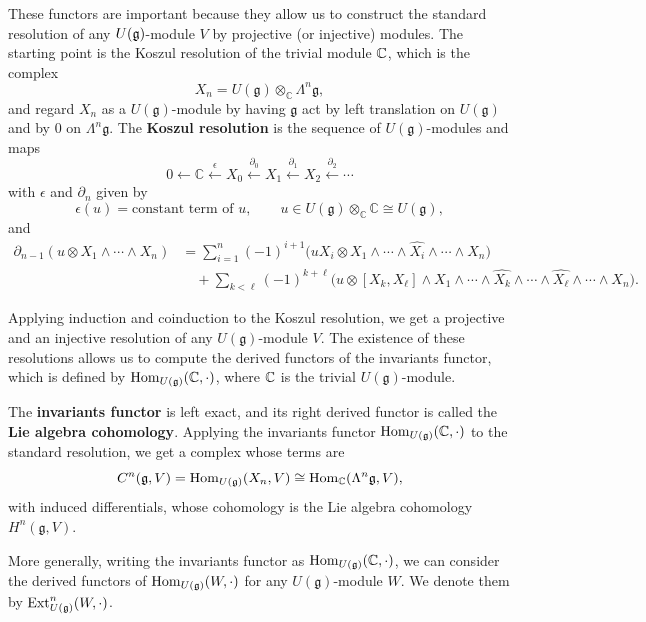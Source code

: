 \documentclass[12pt]{article}
\begin{document}
These functors are important because they allow us to construct the standard resolution of any $U(\mathfrak{g})$-module $V$ by projective (or injective) modules. The starting point is the Koszul resolution of the trivial module $\mathbb{C}$, which is the complex
\[
X_n = U(\mathfrak g)\otimes_{\mathbb C}\Lambda^n \mathfrak g,
\]
and regard $X_n$ as a $U(\mathfrak g)$-module by having $\mathfrak g$
act by left translation on $U(\mathfrak g)$ and by $0$ on
$\Lambda^n \mathfrak g$. The \textbf{Koszul resolution} is the sequence
of $U(\mathfrak g)$-modules and maps
\[
0 \longleftarrow \mathbb C
\stackrel{\epsilon}{\longleftarrow} X_0
\stackrel{\partial_0}{\longleftarrow} X_1
\stackrel{\partial_1}{\longleftarrow} X_2
\stackrel{\partial_2}{\longleftarrow} \cdots
\]
with $\epsilon$ and $\partial_n$ given by
\[
\epsilon(u)=\text{constant term of }u,
\qquad
u\in U(\mathfrak g)\otimes_{\mathbb C}\mathbb C \cong U(\mathfrak g),
\]
and
\begin{align*}
\partial_{n-1}(u\otimes X_1\wedge\cdots\wedge X_n)
&=
\sum_{i=1}^n (-1)^{i+1}
\bigl(uX_i\otimes X_1\wedge\cdots\wedge \widehat{X_i}\wedge\cdots\wedge X_n\bigr)
\nonumber\\
&\quad
+\sum_{k<\ell} (-1)^{k+\ell}
\bigl(u\otimes [X_k,X_\ell]\wedge X_1\wedge\cdots\wedge \widehat{X_k}
\wedge\cdots\wedge \widehat{X_\ell}\wedge\cdots\wedge X_n\bigr).
\end{align*}

Applying induction and coinduction to the Koszul resolution, we get a projective and an injective resolution of any $U(\mathfrak g)$-module $V$. The existence of these resolutions allows us to compute the derived functors of the invariants functor, which is defined by $\operatorname{Hom}_{U(\mathfrak g)}(\mathbb{C},\cdot)$, where $\mathbb{C}$ is the trivial $U(\mathfrak g)$-module.


The \textbf{invariants functor} is left exact, and its right derived functor is called the \textbf{Lie algebra cohomology}. Applying the invariants functor $\operatorname{Hom}_{U(\mathfrak g)}(\mathbb{C},\cdot)$ to the standard resolution, we get a complex whose terms are \[C^n(\mathfrak g,V)=\operatorname{Hom}_{U(\mathfrak g)}(X_n,V)\cong \operatorname{Hom}_{\mathbb C}(\Lambda^n \mathfrak g,V),\] with induced differentials, whose cohomology is the Lie algebra cohomology $H^n(\mathfrak g,V)$.

More generally, writing the invariants functor as $\operatorname{Hom}_{U(\mathfrak g)}(\mathbb{C},\cdot)$, we can consider the derived functors of $\operatorname{Hom}_{U(\mathfrak g)}(W,\cdot)$ for any $U(\mathfrak g)$-module $W$. We denote them by $\operatorname{Ext}_{U(\mathfrak g)}^n(W,\cdot)$. 
\end{document}
